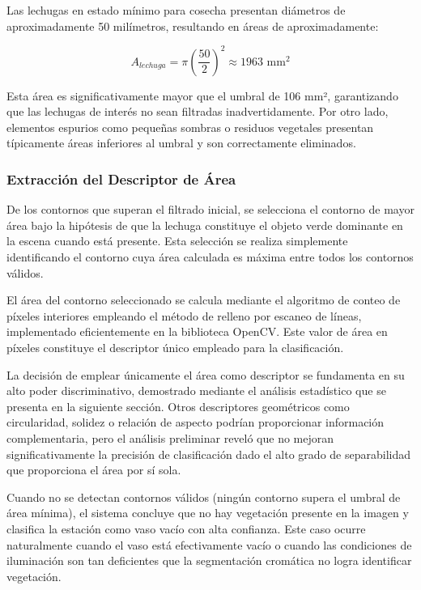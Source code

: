 Las lechugas en estado mínimo para cosecha presentan diámetros de aproximadamente 50 milímetros, resultando en áreas de aproximadamente:

\begin{equation}
A_{lechuga} = \pi \left(\frac{50}{2}\right)^2 \approx 1963 \text{ mm}^2
\end{equation}

Esta área es significativamente mayor que el umbral de 106 mm², garantizando que las lechugas de interés no sean filtradas inadvertidamente. Por otro lado, elementos espurios como pequeñas sombras o residuos vegetales presentan típicamente áreas inferiores al umbral y son correctamente eliminados.

\subsubsection{Extracción del Descriptor de Área}

De los contornos que superan el filtrado inicial, se selecciona el contorno de mayor área bajo la hipótesis de que la lechuga constituye el objeto verde dominante en la escena cuando está presente. Esta selección se realiza simplemente identificando el contorno cuya área calculada es máxima entre todos los contornos válidos.

El área del contorno seleccionado se calcula mediante el algoritmo de conteo de píxeles interiores empleando el método de relleno por escaneo de líneas, implementado eficientemente en la biblioteca OpenCV. Este valor de área en píxeles constituye el descriptor único empleado para la clasificación.

La decisión de emplear únicamente el área como descriptor se fundamenta en su alto poder discriminativo, demostrado mediante el análisis estadístico que se presenta en la siguiente sección. Otros descriptores geométricos como circularidad, solidez o relación de aspecto podrían proporcionar información complementaria, pero el análisis preliminar reveló que no mejoran significativamente la precisión de clasificación dado el alto grado de separabilidad que proporciona el área por sí sola.

Cuando no se detectan contornos válidos (ningún contorno supera el umbral de área mínima), el sistema concluye que no hay vegetación presente en la imagen y clasifica la estación como vaso vacío con alta confianza. Este caso ocurre naturalmente cuando el vaso está efectivamente vacío o cuando las condiciones de iluminación son tan deficientes que la segmentación cromática no logra identificar vegetación.

